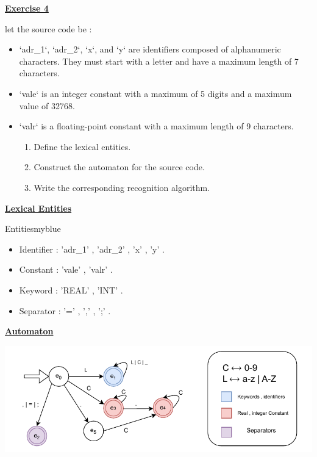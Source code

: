 \newpage

\begin{center}
    \Huge{\textbf{\underline{Exercise 4}}}
\end{center}

\vspace{0.3cm}

let the source code be :

\vspace{0.25cm}


\vspace{0.35cm}

\begin{itemize}
    \item `adr\_1`, `adr\_2`, `x`, and `y` are identifiers composed of alphanumeric characters.  
          They must start with a letter and have a maximum length of 7 characters.  
    \item `vale` is an integer constant with a maximum of 5 digits and a maximum value of 32768.  
    \item `valr` is a floating-point constant with a maximum length of 9 characters.  
    \begin{enumerate}
        \item Define the lexical entities.  
        \item Construct the automaton for the source code.  
        \item Write the corresponding recognition algorithm.  
    \end{enumerate}
\end{itemize}

\vspace{0.5cm}
\textbf{\underline{Lexical Entities}}
\begin{prettyBox}{Entities}{myblue}
\begin{itemize}
    \item Identifier : 'adr\_1' , 'adr\_2' , 'x' , 'y' . 
    \item Constant : 'vale' , 'valr' .
    \item Keyword : 'REAL' , 'INT' .
    \item Separator : '=' , ',' , ';' .
\end{itemize}
\end{prettyBox}

\vspace{1cm}
\textbf{\underline{Automaton}}
\begin{center} 
    \includegraphics[height=0.3\textheight]{Exercices/EX4/ex4.drawio.pdf}
\end{center}


